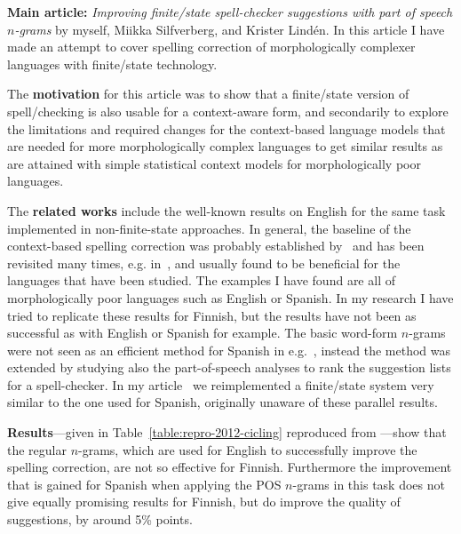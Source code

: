 \documentclass[officiallayout]{unihelcompling}
\begin{document}
\textbf{Main article:} \emph{Improving finite\-/state spell-checker suggestions
with part of speech \(n\)-grams} by myself, Miikka Silfverberg, and Krister
Lindén. In this article I have made an attempt to cover spelling correction
of morphologically complexer languages with finite\-/state technology.

The \textbf{motivation} for this article was to show that a finite\-/state
version of spell\-/checking is also usable for a context-aware form, and
secondarily to explore the limitations and required changes for the
context-based language models that are needed for more morphologically complex
languages to get similar results as are attained with simple statistical
context models for morphologically poor languages.

The \textbf{related works} include the well-known results on English for the
same task implemented in non-finite-state approaches.  In general, the baseline of the
context-based spelling correction was probably established
by~\citet{mays1991context} and has been revisited many times, e.g.
in~\citet{wilcox-ohearn2008realword}, and usually found to be beneficial for
the languages that have been studied. The examples I have found are all of
morphologically poor languages such as English or Spanish. In my research I
have tried to replicate these results for Finnish, but the results have not
been as successful as with English or Spanish for example.  The basic word-form
\(n\)-grams were not seen as an efficient method for Spanish in
e.g.~\citet{otero2007contextual}, instead the method was extended by studying
also the part-of-speech analyses to rank the suggestion lists for a
spell-checker. In my article~ we reimplemented
a finite\-/state system very similar to the one used for Spanish, originally
unaware of these parallel results.

\textbf{Results}---given in Table~\ref{table:repro-2012-cicling} reproduced
from ---show that the regular \(n\)-grams, which
are used for English to successfully improve the spelling correction, are not
so effective for Finnish.  Furthermore the improvement that is gained for
Spanish when applying the POS \(n\)-grams in this task does not give equally
promising results for Finnish, but do improve the quality of suggestions, by
around 5\% points.
\end{document}
